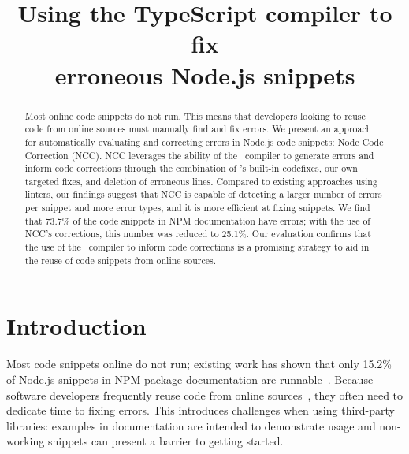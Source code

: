\documentclass[conference]{IEEEtran}
\begin{document}
\title{Using the TypeScript compiler to fix\\erroneous Node.js snippets}

\author{
\and
{}
\and
{}
}


\maketitle

\begin{abstract}


Most online code snippets do not run. This means that developers looking to reuse code from online sources must manually find and fix errors. We present an approach for automatically evaluating and correcting errors in Node.js code snippets: Node Code Correction (NCC). NCC leverages the ability of the \ts\ compiler to generate errors and inform code corrections through the combination of \ts{}'s built-in codefixes, our own targeted fixes, and deletion of erroneous lines. Compared to existing approaches using linters, our findings suggest that NCC is capable of detecting a larger number of errors per snippet and more error types, and it is more efficient at fixing snippets. We find that 73.7\% of the code snippets in NPM documentation have errors; with the use of NCC's corrections, this number was reduced to 25.1\%. Our evaluation confirms that the use of the \ts\ compiler to inform code corrections is a promising strategy to aid in the reuse of code snippets from online sources.

\end{abstract}

\section{Introduction}

Most code snippets online do not run; existing work has shown that only 15.2\% of Node.js snippets in NPM package documentation are runnable~\cite{chinthanet2021makes}. Because software developers frequently reuse code from online sources~\cite{Baltes2019}, they often need to dedicate time to fixing errors. This introduces challenges when using third-party libraries: examples in documentation are intended to demonstrate usage and non-working snippets can present a barrier to getting started.
\end{document}
